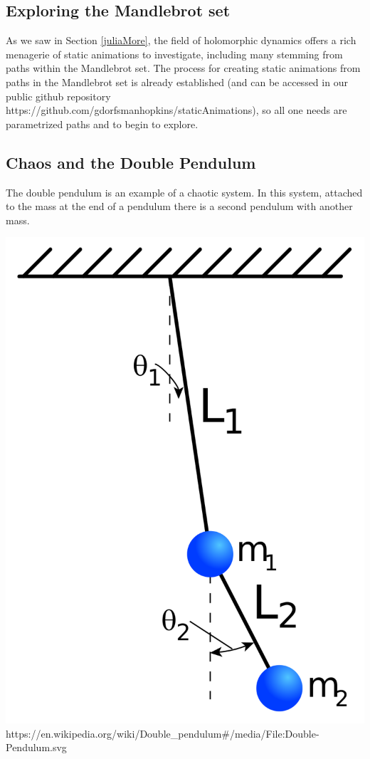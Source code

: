 \documentclass[12 pt]{article}
\begin{document}
\subsection{Exploring the Mandlebrot set}
As we saw in Section \ref{juliaMore}, the field of holomorphic dynamics offers a rich menagerie of static animations to investigate, including many stemming from paths within the Mandlebrot set. The process for creating static animations from paths in the Mandlebrot set is already established (and can be accessed in our public github repository https://github.com/gdorfsmanhopkins/staticAnimations), so all one needs are parametrized paths and to begin to explore.
\subsection{Chaos and the Double Pendulum}
The double pendulum \cite{chaos} is an example of a chaotic system.  In this system, attached to the mass at the end of a pendulum there is a second pendulum with another mass.
\begin{center}
    \includegraphics[width=.15\paperwidth]{images/Double-Pendulum.png}
    https://en.wikipedia.org/wiki/Double_pendulum#/media/File:Double-Pendulum.svg
\end{center}
\end{document}
